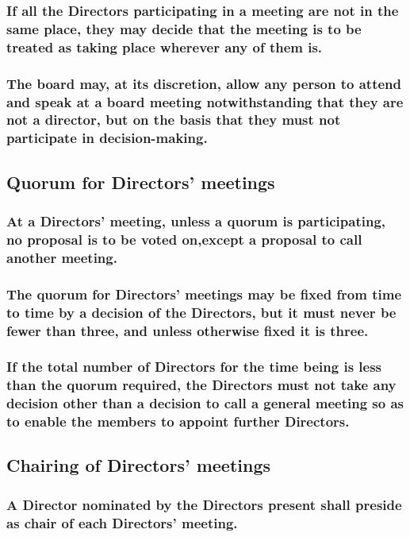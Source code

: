 \documentclass[12pt]{article}
\begin{document}
\subsubsection{If all the Directors participating in a meeting are not in the same place, they may decide that the meeting is to be treated as taking place wherever any of them is.}
\subsubsection{The board may, at its discretion, allow any person to attend and speak at a board meeting notwithstanding that they are not a director, but on the basis that they must not participate in decision-making.}

\subsection{Quorum for Directors’ meetings}
\subsubsection{At a Directors’ meeting, unless a quorum is participating, no proposal is to be voted on,except a proposal to call another meeting.}
\subsubsection{The quorum for Directors’ meetings may be fixed from time to time by a decision of the Directors, but it must never be fewer than three, and unless otherwise fixed it is three.}
\subsubsection{If the total number of Directors for the time being is less than the quorum required, the Directors must not take any decision other than a decision to call a general meeting so as to enable the members to appoint further Directors.}

\subsection{Chairing of Directors’ meetings}
\subsubsection{A Director nominated by the Directors present shall preside as chair of each Directors’ meeting.}

\end{document}
